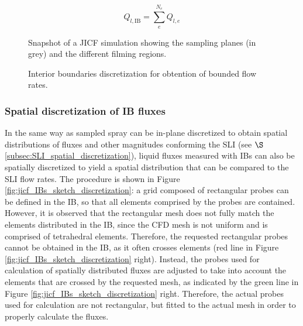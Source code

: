 \begin{equation}
\label{eq:Q_lIB_general_definition}
Q_{l,\mathrm{IB}} = \sum_{e}^{N_e} Q_{l,e}
\end{equation}

\begin{figure}[ht]
     \centering
     \caption{Snapshot of a JICF simulation showing the sampling planes (in grey) and the different filming regions.}
      \label{fig:jicf_interior_boundaries_surface_measurements}
\end{figure}

\begin{figure}[ht]
     \centering
     \caption{Interior boundaries discretization for obtention of bounded flow rates.}
      \label{fig:jicf_IBs_sketch_calculation}
\end{figure}

\subsubsection*{Spatial discretization of IB fluxes}

In the same way as sampled spray can be in-plane discretized to obtain spatial distributions of fluxes and other magnitudes conforming the SLI (see $\S$\ref{subsec:SLI_spatial_discretization}), liquid fluxes measured with IBs can also be spatially discretized to yield a spatial distribution that can be compared to the SLI flow rates. The procedure is shown in Figure \ref{fig:jicf_IBs_sketch_discretization}: a grid composed of rectangular probes can be defined in the IB, so that all elements comprised by the probes are contained. However, it is observed that the rectangular mesh does not fully match the elements distributed in the IB, since the CFD mesh is not uniform and is comprised of tetrahedral elements. Therefore, the requested rectangular probes cannot be obtained in the IB, as it often crosses elements (red line in Figure \ref{fig:jicf_IBs_sketch_discretization} right). Instead, the probes used for calculation of spatially distributed fluxes are adjusted to take into account the elements that are crossed by the requested mesh, as indicated by the green line in Figure \ref{fig:jicf_IBs_sketch_discretization} right. Therefore, the actual probes used for calculation are not rectangular, but fitted to the actual mesh in order to properly calculate the fluxes.

